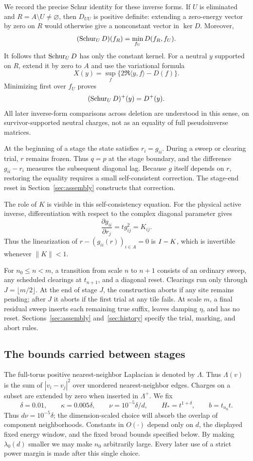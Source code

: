 We record the precise Schur identity for these inverse forms. If
$U$ is eliminated and $R=A\setminus U\ne\varnothing$, then $D_{UU}$
is positive definite: extending a zero-energy vector by zero on $R$
would otherwise give a nonconstant vector in $\ker D$. Moreover,
\[
 (\operatorname{Schur}_U D)(f_R)=\min_{f_U}D(f_R,f_U).
\]
It follows that $\operatorname{Schur}_U D$ has only the constant kernel. For a
neutral $y$ supported on $R$, extend it by zero to $A$ and use the
variational formula
\[
 X(y)=\sup_f\{2\Re\langle y,f\rangle-D(f)\}.
\]
Minimizing first over $f_U$ proves
\begin{equation}\label{eq:schur-inverse-form}
 (\operatorname{Schur}_U D)^+(y)=D^+(y).
\end{equation}
All later inverse-form comparisons across deletion are understood in
this sense, on survivor-supported neutral charges, not as an equality
of full pseudoinverse matrices.

At the beginning of a stage the state satisfies $r_i=g_{ii}$.
During a sweep or clearing trial, $r$ remains frozen. Thus $q=p$
at the stage boundary, and the difference $g_{ii}-r_i$ measures the
subsequent diagonal lag. Because $g$ itself depends on $r$, restoring
the equality requires a small self-consistent correction. The stage-end
reset in Section~\ref{sec:assembly} constructs that correction.

The role of $K$ is visible in this self-consistency equation. For the
physical active inverse, differentiation with respect to the complex
diagonal parameter gives
\[
 \frac{\partial g_{ii}}{\partial r_j}=t g_{ij}^2=K_{ij}.
\]
Thus the linearization of $r-(g_{ii}(r))_{i\in A}=0$ is $I-K$, which is
invertible whenever $\|K\|<1$.

For $n_0\le n<m$, a transition from scale $n$ to $n+1$ consists of an
ordinary sweep, any scheduled clearings at $t_{n+1}$, and a diagonal reset.
Clearings run only through $J=\lfloor m/2\rfloor$. At the end of stage $J$,
the construction aborts if any site remains pending; after $J$ it aborts
if the first trial at any tile fails. At scale $m$, a final residual sweep
inserts each remaining true suffix, leaves damping $\eta$, and has no reset.
Sections~\ref{sec:assembly} and~\ref{sec:history} specify the trial, marking,
and abort rules.

\subsection{The bounds carried between stages}

The full-torus positive nearest-neighbor Laplacian is denoted by
$\Lambda$. Thus $\Lambda(v)$ is the sum of $|v_i-v_j|^2$ over unordered
nearest-neighbor edges. Charges on a subset are extended by zero when
inserted in $\Lambda^+$. We fix
\[
 \delta=0.01,\qquad \kappa=0.005\delta,\qquad
 \nu=10^{-5}\delta/d,\qquad H_*=t^{1+\delta},\qquad b=t_{n_0}t.
\]
Thus $d\nu=10^{-5}\delta$; the dimension-scaled choice will absorb the
overlap of component neighborhoods. Constants in $O(\cdot)$ depend
only on $d$, the displayed fixed energy window, and the fixed broad
bounds specified below. By making $\lambda_0(d)$
smaller we may make $n_0$ arbitrarily large. Every later use of a strict
power margin is made after this single choice.

